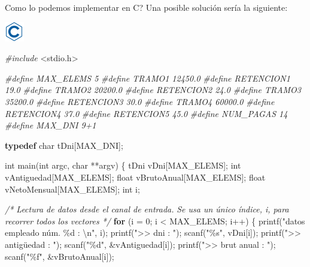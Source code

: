\documentclass[
]{book}
\newenvironment{Shaded}{\begin{snugshade}}{\end{snugshade}}
\newcommand{\CommentTok}[1]{\textcolor[rgb]{0.56,0.35,0.01}{\textit{#1}}}
\newcommand{\ControlFlowTok}[1]{\textcolor[rgb]{0.13,0.29,0.53}{\textbf{#1}}}
\newcommand{\DataTypeTok}[1]{\textcolor[rgb]{0.13,0.29,0.53}{#1}}
\newcommand{\DecValTok}[1]{\textcolor[rgb]{0.00,0.00,0.81}{#1}}
\newcommand{\ImportTok}[1]{#1}
\newcommand{\KeywordTok}[1]{\textcolor[rgb]{0.13,0.29,0.53}{\textbf{#1}}}
\newcommand{\NormalTok}[1]{#1}
\newcommand{\PreprocessorTok}[1]{\textcolor[rgb]{0.56,0.35,0.01}{\textit{#1}}}
\newcommand{\SpecialCharTok}[1]{\textcolor[rgb]{0.00,0.00,0.00}{#1}}
\newcommand{\StringTok}[1]{\textcolor[rgb]{0.31,0.60,0.02}{#1}}
\begin{document}
Como lo podemos implementar en C? Una posible solución sería la siguiente:

\includegraphics{./img/c.png}

\begin{Shaded}
\begin{Highlighting}[]
\PreprocessorTok{\#include }\ImportTok{\textless{}stdio.h\textgreater{}}

\PreprocessorTok{\#define MAX\_ELEMS 5}
\PreprocessorTok{\#define TRAMO1 12450.0}
\PreprocessorTok{\#define RETENCION1 19.0}
\PreprocessorTok{\#define TRAMO2 20200.0}
\PreprocessorTok{\#define RETENCION2 24.0}
\PreprocessorTok{\#define TRAMO3 35200.0}
\PreprocessorTok{\#define RETENCION3 30.0}
\PreprocessorTok{\#define TRAMO4 60000.0}
\PreprocessorTok{\#define RETENCION4 37.0}
\PreprocessorTok{\#define RETENCION5 45.0}
\PreprocessorTok{\#define NUM\_PAGAS 14}
\PreprocessorTok{\#define MAX\_DNI 9+1}

\KeywordTok{typedef} \DataTypeTok{char}\NormalTok{ tDni[MAX\_DNI];}

\DataTypeTok{int}\NormalTok{ main(}\DataTypeTok{int}\NormalTok{ argc, }\DataTypeTok{char}\NormalTok{ **argv) \{}
\NormalTok{    tDni vDni[MAX\_ELEMS];}
    \DataTypeTok{int}\NormalTok{ vAntiguedad[MAX\_ELEMS];}
    \DataTypeTok{float}\NormalTok{ vBrutoAnual[MAX\_ELEMS];}
    \DataTypeTok{float}\NormalTok{ vNetoMensual[MAX\_ELEMS];}
    \DataTypeTok{int}\NormalTok{ i;}

    \CommentTok{/* Lectura de datos desde el canal de entrada.}
\CommentTok{       Se usa un único índice, \textquotesingle{}i\textquotesingle{}, para recorrer todos los vectores */}
    \ControlFlowTok{for}\NormalTok{ (i = }\DecValTok{0}\NormalTok{; i \textless{} MAX\_ELEMS; i++) \{}
\NormalTok{        printf(}\StringTok{"datos empleado núm. \%d : }\SpecialCharTok{\textbackslash{}n}\StringTok{"}\NormalTok{, i);}
\NormalTok{        printf(}\StringTok{"\textgreater{}\textgreater{} dni : "}\NormalTok{);}
\NormalTok{        scanf(}\StringTok{"\%s"}\NormalTok{, vDni[i]);}
\NormalTok{        printf(}\StringTok{"\textgreater{}\textgreater{} antigüedad : "}\NormalTok{);}
\NormalTok{        scanf(}\StringTok{"\%d"}\NormalTok{, \&vAntiguedad[i]);}
\NormalTok{        printf(}\StringTok{"\textgreater{}\textgreater{} brut anual : "}\NormalTok{);}
\NormalTok{        scanf(}\StringTok{"\%f"}\NormalTok{, \&vBrutoAnual[i]);}
        

\end{Highlighting}
\end{Shaded}
\end{document}
